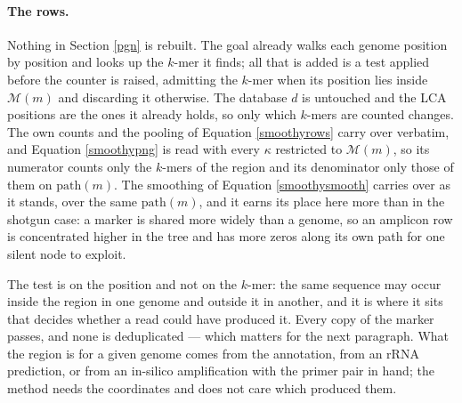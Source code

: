 \documentclass[pdflatex,sn-vancouver-num]{sn-jnl}
\begin{document}
    \paragraph{The rows.} Nothing in Section \ref{pgn} is rebuilt. The goal already walks each genome
    position by position and looks up the $k$-mer it finds; all that is added is a test applied
    before the counter is raised, admitting the $k$-mer when its position lies inside $\mathcal{M}(m)$ and
    discarding it otherwise. The database $d$ is untouched and the LCA positions are the ones it
    already holds, so only which $k$-mers are counted changes. The own counts and the pooling of
    Equation \eqref{smoothyrows} carry over verbatim, and
    Equation \eqref{smoothypng} is read with every $\kappa$ restricted to $\mathcal{M}(m)$, so its numerator
    counts only the $k$-mers of the region and its denominator only those of them on $\mathrm{path}(m)$. The smoothing of Equation \eqref{smoothysmooth} carries over as it stands, over the
    same $\mathrm{path}(m)$, and it earns its place here more than in the shotgun case: a marker is
    shared more widely than a genome, so an amplicon row is concentrated higher in the tree and has
    more zeros along its own path for one silent node to exploit.

    The test is on the position and not on the $k$-mer: the same sequence may occur inside the region
    in one genome and outside it in another, and it is where it sits that decides whether a read
    could have produced it. Every copy of the marker passes, and none is deduplicated --- which
    matters for the next paragraph. What the region is for a given genome comes from the annotation,
    from an rRNA prediction, or from an in-silico amplification with the primer pair in hand; the
    method needs the coordinates and does not care which produced them.
\end{document}
